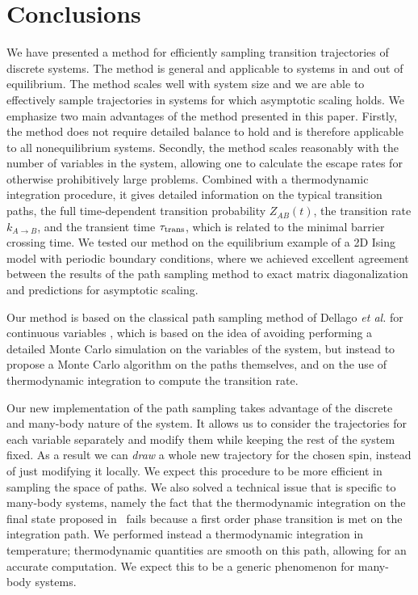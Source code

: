 \documentclass[aps,twocolumn,floats,pre,amsmath,superscriptaddress]{revtex4}
\def\to{\rightarrow} \def\la{\langle} \def\ra{\rangle}
\newcommand{\<}{\langle}
\renewcommand{\>}{\rangle}
\begin{document}
\section{Conclusions}\label{sec:conclu}


We have presented a method for efficiently sampling transition
trajectories of discrete systems. The method is general and applicable
to systems in and out of equilibrium. The method scales well with
system size and we are able to effectively sample trajectories in
systems for which asymptotic scaling holds. We emphasize two main
advantages of the method presented in this paper. Firstly, the method
does not require detailed balance to hold and is therefore applicable
to all nonequilibrium systems.
Secondly, the method scales reasonably with the number of variables in
the system, allowing one to calculate the escape rates for otherwise
prohibitively large problems.
Combined with a thermodynamic integration procedure,
it gives detailed information on the typical transition paths,
the full time-dependent transition probability $Z_{AB}(t)$,
the transition rate $k_{A\to B}$, and 
the transient time $\tau_{\rm trans}$, which is related to the minimal
barrier crossing time.
We tested our method on the equilibrium example of a 2D Ising model
with periodic boundary conditions, where we achieved excellent
agreement between the results of the path sampling method to exact
matrix diagonalization and predictions for asymptotic scaling.

Our method is based on the classical path sampling
method of Dellago {\em et al.} for continuous variables \cite{chandler}, which is
based on the
idea of avoiding performing a detailed Monte Carlo simulation on the
variables of the system, but instead to propose a Monte Carlo
algorithm on the paths themselves, and on the use of thermodynamic
integration to compute the transition rate.

Our new implementation of the path sampling takes advantage of
the discrete and many-body nature of the system.
It allows us to consider the trajectories for each variable separately and
modify them while keeping the rest of the system fixed. As a result we can
\textit{draw} a whole new trajectory for the chosen spin, instead of just
modifying it locally. We expect this procedure to be more efficient in sampling the 
space of paths. We also solved a technical issue that is specific to many-body
systems, namely the fact that the thermodynamic integration on the final state
proposed in~\cite{chandler} fails because a first order phase transition is met on the
integration path. We performed instead a thermodynamic integration in temperature;
thermodynamic quantities are smooth on this path, allowing for an accurate computation.
We expect this to be a generic phenomenon for many-body systems.
\end{document}
